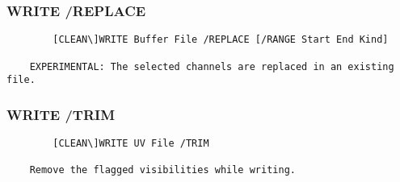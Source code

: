 \subsubsection{WRITE /REPLACE}
\begin{verbatim}
        [CLEAN\]WRITE Buffer File /REPLACE [/RANGE Start End Kind]

    EXPERIMENTAL: The selected channels are replaced in an existing file.

\end{verbatim}
\subsubsection{WRITE /TRIM}
\begin{verbatim}
        [CLEAN\]WRITE UV File /TRIM

    Remove the flagged visibilities while writing.



\end{verbatim}
